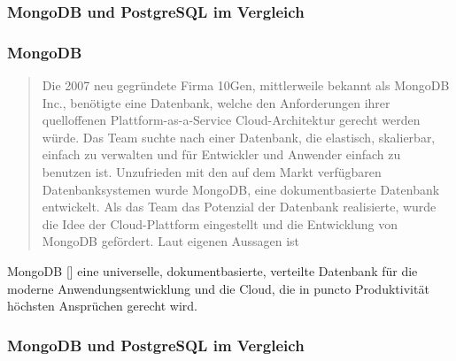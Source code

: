 \subsubsection{MongoDB und PostgreSQL im Vergleich}

\subsubsection{MongoDB}
\begin{quote}
Die 2007 neu gegründete Firma 10Gen, mittlerweile bekannt als MongoDB Inc., benötigte eine Datenbank, welche den Anforderungen ihrer quelloffenen Plattform-as-a-Service Cloud-Architektur gerecht werden würde. Das Team suchte nach einer Datenbank, die elastisch, skalierbar, einfach zu verwalten und für Entwickler und Anwender einfach zu benutzen ist. Unzufrieden mit den auf dem Markt verfügbaren Datenbanksystemen wurde MongoDB, eine dokumentbasierte Datenbank entwickelt. Als das Team das Potenzial der Datenbank realisierte, wurde die Idee der Cloud-Plattform eingestellt und die Entwicklung von MongoDB gefördert.\cite{MG1}
Laut eigenen Aussagen ist 
\end{quote}
MongoDB [] eine universelle, dokumentbasierte, verteilte Datenbank für die moderne Anwendungsentwicklung und die Cloud, die in puncto Produktivität höchsten Ansprüchen gerecht wird. \cite{MG2} 


\subsubsection{MongoDB und PostgreSQL im Vergleich}

